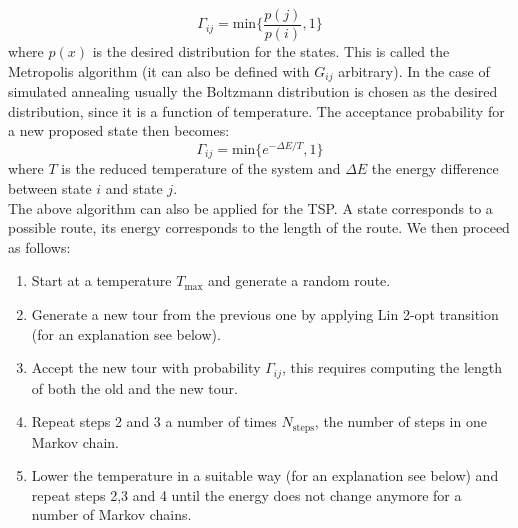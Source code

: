 \documentclass[10pt,a4paper]{article}
\begin{document}
\begin{equation}
  \Gamma_{ij} = \text{min} \{ \frac{p(j)}{p(i)},1 \}
\end{equation}
where $p(x)$ is the desired distribution for the states. This is called the Metropolis algorithm (it can also be defined with $G_{ij}$ arbitrary). In the case of simulated annealing usually the Boltzmann distribution is chosen as the desired distribution, since it is a function of temperature. The acceptance probability for a new proposed state then becomes:
\begin{equation}
  \Gamma_{ij} = \text{min} \{ e^{-\Delta E/T},1 \}
\end{equation}
where $T$ is the reduced temperature of the system and $\Delta E$ the energy difference between state $i$ and state $j$.\\

The above algorithm can also be applied for the TSP. A state corresponds to a possible route, its energy corresponds to the length of the route. We then proceed as follows:
\begin{enumerate}
\item 
  Start at a temperature $T_{\text{max}}$ and generate a random route.
\item
  Generate a new tour from the previous one by applying Lin 2-opt transition (for an explanation see below).
\item
  Accept the new tour with probability $\Gamma_{ij}$, this requires computing the length of both the old and the new tour.
\item
  Repeat steps 2 and 3 a number of times $N_{\text{steps}}$, the number of steps in one Markov chain.
\item
  Lower the temperature in a suitable way (for an explanation see below) and repeat steps 2,3 and 4 until the energy does not change anymore for a number of Markov chains.
\end{enumerate}
\end{document}
